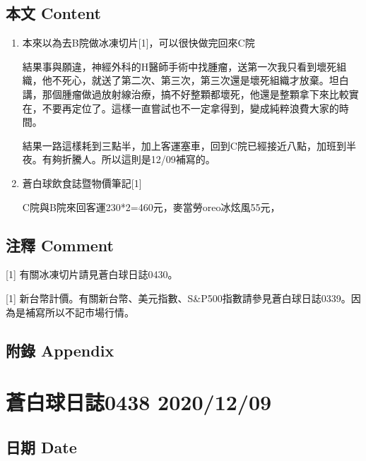 \documentclass[
]{article}
\begin{document}
\hypertarget{ux672cux6587-content-7}{%
\subsection{本文 Content}\label{ux672cux6587-content-7}}

\begin{enumerate}
\def\labelenumi{\arabic{enumi}.}
\item
  本來以為去B院做冰凍切片{[}1{]}，可以很快做完回來C院

  結果事與願違，神經外科的H醫師手術中找腫瘤，送第一次我只看到壞死組織，他不死心，就送了第二次、第三次，第三次還是壞死組織才放棄。坦白講，那個腫瘤做過放射線治療，搞不好整顆都壞死，他還是整顆拿下來比較實在，不要再定位了。這樣一直嘗試也不一定拿得到，變成純粹浪費大家的時間。

  結果一路這樣耗到三點半，加上客運塞車，回到C院已經接近八點，加班到半夜。有夠折騰人。所以這則是12/09補寫的。
\item
  蒼白球飲食誌暨物價筆記{[}1{]}

  C院與B院來回客運230*2=460元，麥當勞oreo冰炫風55元，
\end{enumerate}

\hypertarget{ux6ce8ux91cb-comment-7}{%
\subsection{注釋 Comment}\label{ux6ce8ux91cb-comment-7}}

{[}1{]} 有關冰凍切片請見蒼白球日誌0430。

{[}1{]}
新台幣計價。有關新台幣、美元指數、S\&P500指數請參見蒼白球日誌0339。因為是補寫所以不記市場行情。

\hypertarget{ux9644ux9304-appendix-7}{%
\subsection{附錄 Appendix}\label{ux9644ux9304-appendix-7}}

\hypertarget{ux84bcux767dux7403ux65e5ux8a8c0438-20201209}{%
\section{蒼白球日誌0438
2020/12/09}\label{ux84bcux767dux7403ux65e5ux8a8c0438-20201209}}

\hypertarget{ux65e5ux671f-date-8}{%
\subsection{日期 Date}\label{ux65e5ux671f-date-8}}
\end{document}
